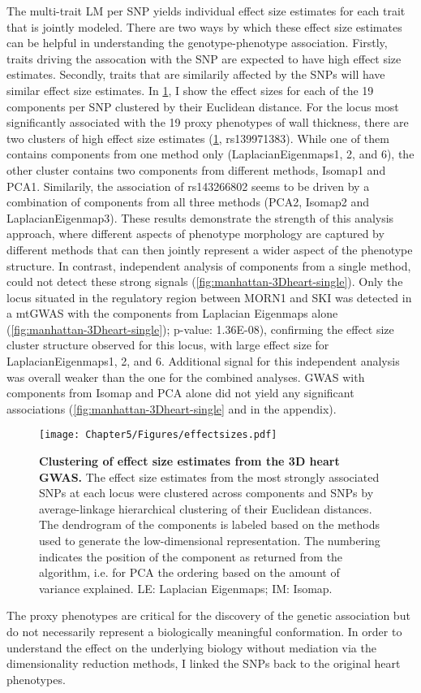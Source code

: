 %
The multi-trait LM per SNP yields individual effect size estimates for each trait that is jointly modeled. There are two ways by which these effect size estimates can be helpful in understanding the genotype-phenotype association. Firstly, traits driving the assocation with the SNP are expected to have high effect size estimates. Secondly, traits that are similarily affected by the SNPs will have similar effect size estimates.  In \cref{fig:effectsizes-heart}, I show the effect sizes for each of the \num{19} components per SNP clustered by their Euclidean distance. For the locus most significantly associated with the \num{19} proxy phenotypes of wall thickness, there are two clusters of high effect size estimates (\cref{fig:effectsizes-heart}, rs139971383). While one of them contains components from one method only (LaplacianEigenmaps1, 2, and 6), the other cluster contains two components from different methods, Isomap1 and PCA1. Similarily, the association of rs143266802 seems to be driven by a combination of components from all three methods (PCA2, Isomap2 and LaplacianEigenmap3). These results demonstrate the strength of this analysis approach, where different aspects of phenotype morphology are captured by different methods that can then jointly represent a wider aspect of the phenotype structure. In contrast, independent analysis of components from a single method, could not detect these strong signals (\cref{fig:manhattan-3Dheart-single}). Only the locus situated in the regulatory region between MORN1 and SKI was detected in a mtGWAS with the components from Laplacian Eigenmaps alone (\cref{fig:manhattan-3Dheart-single}); p-value: \num{1.36E-08}), confirming the effect size cluster structure observed for this locus, with large effect size for LaplacianEigenmaps1, 2, and 6. Additional signal for this independent analysis was overall weaker than the one for the combined analyses. GWAS with components from Isomap and PCA alone did not yield any significant associations (\cref{fig:manhattan-3Dheart-single} and  in the appendix). 
%
\begin{figure}[hbtp]
	\centering
	\texttt{[image: Chapter5/Figures/effectsizes.pdf]}
	\caption[\textbf{Clustering of effect size estimates from the 3D heart GWAS. }]{\textbf{Clustering of effect size estimates from the 3D heart GWAS. } The effect size estimates from the most strongly associated SNPs at each locus were clustered across components and SNPs by average-linkage hierarchical clustering of their Euclidean distances. The dendrogram of the components is labeled based on the methods used to generate the low-dimensional representation. The numbering indicates the position of the component as returned from the algorithm, i.e. for PCA the ordering based on the amount of variance explained. LE: Laplacian Eigenmaps; IM: Isomap.} 
	 	\label{fig:effectsizes-heart}
\end{figure}
%
The proxy phenotypes are critical for the discovery of the genetic association but do not necessarily represent a biologically meaningful conformation. In order to understand the effect on the underlying biology without mediation via the dimensionality reduction methods, I linked the SNPs back to the original heart phenotypes.

